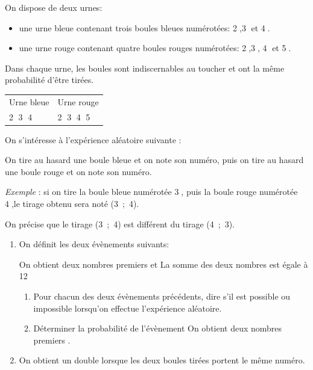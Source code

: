 \documentclass[a4paper,10pt]{report}
\begin{document}
\begin{ex}
On dispose de deux urnes:

\begin{itemize}
\item une urne bleue contenant trois boules bleues numérotées: \textcircled{2},\textcircled{3} et \textcircled{4}.
\item une urne rouge contenant quatre boules rouges numérotées: \textcircled{2},\textcircled{3}, \textcircled{4} et \textcircled{5}.
\end{itemize}

Dans chaque urne, les boules sont indiscernables au toucher et ont la même probabilité d'être tirées.

\begin{center}
\begin{tabularx}{\linewidth}{|*{2}{>{\centering \arraybackslash}X|}}\hline
Urne bleue &Urne rouge\\
\textcircled{2} \textcircled{3}  \textcircled{4}& \textcircled{2} \textcircled{3} \textcircled{4}  \textcircled{5}\\ \hline
\end{tabularx}
\end{center}
\medskip

On s'intéresse à l'expérience aléatoire suivante :

\og On tire au hasard une boule bleue et on note son numéro, puis on tire au hasard une boule rouge et on note son numéro. \fg

\emph{Exemple} : si on tire la boule bleue numérotée \textcircled{3}, puis la boule rouge numérotée \textcircled{4},le tirage obtenu sera noté (3~;~4).

On précise que le tirage (3~;~4) est différent du tirage (4~;~3).

\medskip

\begin{enumerate}
\item On définit les deux évènements suivants:

\og On obtient deux nombres premiers \fg{} et \og La somme des deux nombres est égale à 12 \fg
	\begin{enumerate}
		\item Pour chacun des deux évènements précédents, dire s'il est possible ou impossible lorsqu'on effectue l'expérience aléatoire.
		\item Déterminer la probabilité de l'évènement \og On obtient deux nombres premiers \fg.
	\end{enumerate}
\item On obtient un \og double \fg{} lorsque les deux boules tirées portent le même numéro. 


\end{enumerate}
\end{ex}
\end{document}
